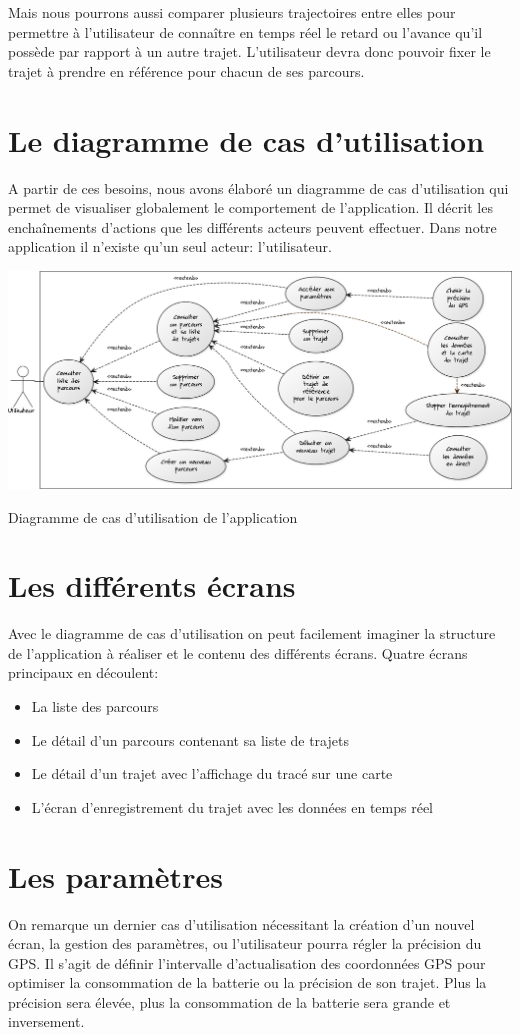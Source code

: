 Mais nous pourrons aussi comparer plusieurs trajectoires entre elles pour permettre à l'utilisateur de connaître en temps réel le retard ou l'avance qu'il possède par rapport à un autre trajet. L'utilisateur devra donc pouvoir fixer le trajet à prendre en référence pour chacun de ses parcours. 

\section{Le diagramme de cas d'utilisation}
A partir de ces besoins, nous avons élaboré un diagramme de cas d'utilisation qui permet de visualiser globalement le comportement de l'application. Il décrit les enchaînements d'actions que les différents acteurs peuvent effectuer. Dans notre application il n'existe qu'un seul acteur: l'utilisateur.

\begin{img}
  \includegraphics[scale=0.35]{img/DUC.png}
  \caption{Diagramme de cas d'utilisation de l'application}
\end{img}

\section{Les différents écrans}
Avec le diagramme de cas d'utilisation on peut facilement imaginer la structure de l'application à réaliser et le contenu des différents écrans. Quatre écrans principaux en découlent:\bigskip

\begin{itemize}
  \item La liste des parcours
  \item Le détail d'un parcours contenant sa liste de trajets
  \item Le détail d'un trajet avec l'affichage du tracé sur une carte
  \item L'écran d'enregistrement du trajet avec les données en temps réel 
\end{itemize}\bigskip

\section{Les paramètres}
On remarque un dernier cas d'utilisation nécessitant la création d'un nouvel écran, la gestion des paramètres, ou l'utilisateur pourra régler la précision du GPS. Il s'agit de définir l'intervalle d'actualisation des coordonnées GPS pour optimiser la consommation de la batterie ou la précision de son trajet. Plus la précision sera élevée, plus la consommation de la batterie sera grande et inversement.
 